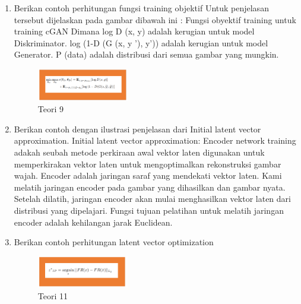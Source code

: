 \begin{enumerate}
	\item Berikan contoh perhitungan fungsi training objektif
	\hfill\break
	Untuk penjelasan tersebut dijelaskan pada gambar dibawah ini :
	Fungsi obyektif training untuk training cGAN Dimana log D (x, y) adalah kerugian untuk model Diskriminator. log (1-D (G (x, y ’), y’)) adalah kerugian untuk model Generator. P (data) adalah distribusi dari semua gambar yang mungkin.
	\begin{figure}[H]
		\includegraphics[width=4cm]{figures/1164013/9/teori9.png}
		\centering
		\caption{Teori 9}
	\end{figure}

	\item Berikan contoh dengan ilustrasi penjelasan dari Initial latent vector approximation.
	\hfill\break
	Initial latent vector approximation: Encoder network training adakah seubah metode perkiraan awal vektor laten digunakan untuk memperkirakan vektor laten untuk mengoptimalkan rekonstruksi gambar wajah. Encoder adalah jaringan saraf yang mendekati vektor laten. Kami melatih jaringan encoder pada gambar yang dihasilkan dan gambar nyata. Setelah dilatih, jaringan encoder akan mulai menghasilkan vektor laten dari distribusi yang dipelajari. Fungsi tujuan pelatihan untuk melatih jaringan encoder adalah kehilangan jarak Euclidean.

	\item Berikan contoh perhitungan latent vector optimization
	\hfill\break
	\begin{figure}[H]
		\includegraphics[width=4cm]{figures/1164013/9/teori11.png}
		\centering
		\caption{Teori 11}
	\end{figure}
\end{enumerate}
